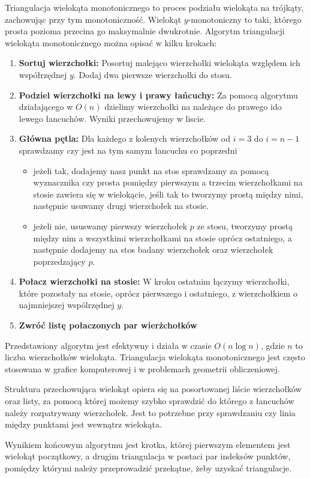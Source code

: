 \quad Triangulacja wielokąta monotonicznego to proces podziału wielokąta na trójkąty, zachowując przy tym monotoniczność. Wielokąt $y$-monotoniczny to taki, którego prosta pozioma przecina go maksymalnie dwukrotnie. Algorytm triangulacji wielokąta monotonicznego można opisać w kilku krokach:

\begin{enumerate}
\item \textbf{Sortuj wierzchołki:} Posortuj malejąco wierzchołki wielokąta względem ich współrzędnej $y$. Dodaj dwa pierwsze wierzchołki do stosu.

\item \textbf{Podziel wierzchołki na lewy i prawy łańcuchy:} Za pomocą algorytmu działającego w $O(n)$ dzielimy wierzchołki na należące do prawego ido lewego łancuchów. 
Wyniki przechowujemy w liscie.

\item \textbf{Główna pętla:} Dla każdego z kolenych wierzchołków od $i = 3$ do $i = n-1$ sprawdzamy czy jest na tym samym łancuchu co poprzedni

\begin{itemize}
    \item jeżeli tak, 
    dodajemy nasz punkt na stos
    sprawdzamy za pomocą wyznacznika czy prosta pomiędzy pierwszym a trzecim wierzchołkami na stosie zawiera się w wielokącie, jeśli tak to tworzymy prostą między nimi, następnie usuwamy drugi wierzchołek na stosie.
    
    
    \item jeżeli nie, 
    ususwamy pierwszy wierzchołek $p$ ze stosu,
    tworzymy prostą między nim a wszystkimi wierzchołkami na stosie oprócz ostatniego, a następnie dodajemy na stos badany wierzchołek oraz wierzchołek poprzedzający $p$.
\end{itemize}

\item \textbf{Połacz wierzchołki na stosie: } W kroku ostatnim łączymy wierzchołki, które pozostały na stosie, oprócz pierwszego i ostatniego, z wierzchołkiem o najmniejszej wspólrzędnej $y$.
\item \textbf{Zwróć listę połaczonych par wierżchołków}

\end{enumerate}


Przedstawiony algorytm jest efektywny i działa w czasie \(O(n \log n)\), gdzie \(n\) to liczba wierzchołków wielokąta. Triangulacja wielokąta monotonicznego jest często stosowana w grafice komputerowej i w problemach geometrii obliczeniowej.

Struktura przechowująca wielokąt opiera się na posortowanej liście wierzchołków oraz listy, za pomocą której możemy szybko sprawdzić do którego z łancuchów należy rozpatrywany wierzchołek. 
Jest to potrzebne przy sprawdzaniu czy linia między punktami jest wewnątrz wielokąta.

Wynikiem końcowym algorytmu jest krotka, której pierwszym elementem jest wielokąt początkowy, a drugim triangulacja w postaci par indeksów punktów, pomiędzy którymi należy przeprowadzić przekątne, żeby uzyskać triangulacje.